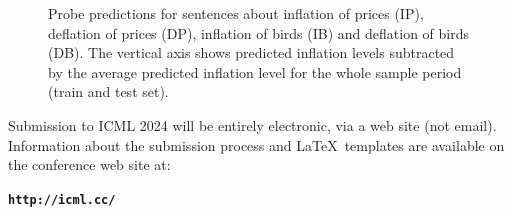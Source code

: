 \documentclass{article}
\theoremstyle{plain}
\theoremstyle{definition}
\theoremstyle{remark}
\begin{document}
\begin{figure}


\caption{\label{fig-attack}Probe predictions for sentences about
inflation of prices (IP), deflation of prices (DP), inflation of birds
(IB) and deflation of birds (DB). The vertical axis shows predicted
inflation levels subtracted by the average predicted inflation level for
the whole sample period (train and test set).}

\end{figure}%





Submission to ICML 2024 will be entirely electronic, via a web site
(not email). Information about the submission process and \LaTeX\ templates
are available on the conference web site at:
\begin{center}
\textbf{\texttt{http://icml.cc/}}
\end{center}
\end{document}
